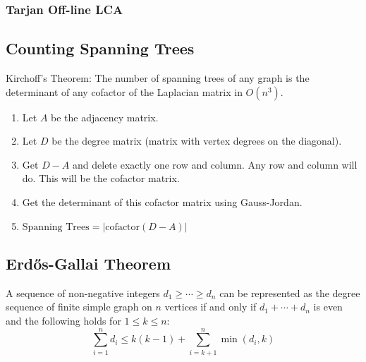     \subsubsection{Tarjan Off-line LCA}
  \subsection{Counting Spanning Trees}
    Kirchoff's Theorem: The number of spanning trees of any graph is the
    determinant of any cofactor of the Laplacian matrix in $O(n^3)$.
    \begin{enumerate}
        \item Let $A$ be the adjacency matrix.
        \item Let $D$ be the degree matrix (matrix with vertex degrees on the diagonal).
        \item Get $D-A$ and delete exactly one row and column. Any row and
        column will do. This will be the cofactor matrix.
        \item Get the determinant of this cofactor matrix using Gauss-Jordan.
        \item $\text{Spanning Trees} = \left|\mathrm{cofactor}(D-A) \right|$
    \end{enumerate}
  \subsection{Erd\H{o}s-Gallai Theorem}
    A sequence of non-negative integers $d_1 \ge \cdots \ge d_n$ can be represented as the
    degree sequence of finite simple graph on $n$ vertices if and only if $d_1 + \cdots + d_n$ is
    even and the following holds for $1 \le k \le n$:
    \[
    \sum_{i=1}^n d_i \le k(k-1) + \sum_{i=k+1}^n \min\left(d_i, k\right)
    \]
